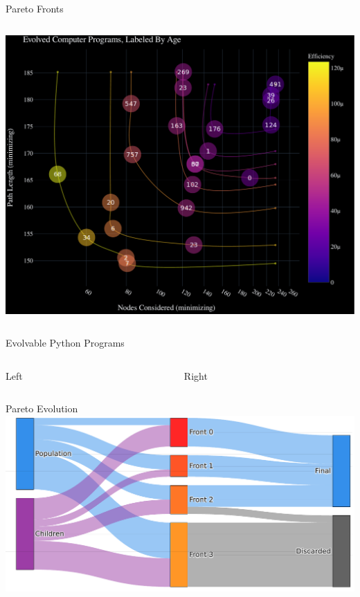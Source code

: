 \documentclass[aspectratio=169]{beamer}
\begin{document}
\begin{frame}{Pareto Fronts}
\begin{columns}[T]
\begin{column}{.6\linewidth}
      \includegraphics[width=0.9\linewidth, keepaspectratio]{figures/total_pareto_overview.pdf}
      \end{column}
  \end{columns}
\end{frame}

\begin{frame}{Evolvable Python Programs}
  \begin{columns}[T]
      \begin{column}{.4\linewidth}
      Left
      \end{column}
      \begin{column}{.6\linewidth}
      Right
      \end{column}
  \end{columns}
\end{frame}

\begin{frame}{Pareto Evolution}
    \includegraphics[width=1.0\linewidth, keepaspectratio]{figures/paretoev.pdf}
\end{frame}
\end{document}
